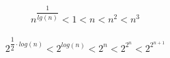 \documentclass[11pt]{article}
\begin{document}
    \begin{align}
       n^{\dfrac{1}{lg(n)}} < 1 < n < n^2 < n^3
    \end{align}

     \begin{align}
       2^{\dfrac{1}{2} \cdot log(n)} < 2^{log(n)} < 2^{n} < 2^{2^{n}} < 2^{2^{n+1}}
    \end{align}
\end{document}
